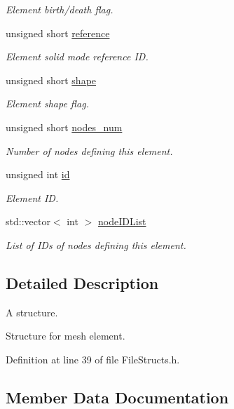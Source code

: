 \begin{DoxyCompactItemize}
\begin{DoxyCompactList}\small\item\em Element birth/death flag. \end{DoxyCompactList}\item 
unsigned short \hyperlink{struct___elements_s_af9fa947d626f4bcdcb030fe4fab611c4}{reference}
\begin{DoxyCompactList}\small\item\em Element solid mode reference ID. \end{DoxyCompactList}\item 
unsigned short \hyperlink{struct___elements_s_aff93e58a2996c7dcae7441a7d6804da0}{shape}
\begin{DoxyCompactList}\small\item\em Element shape flag. \end{DoxyCompactList}\item 
unsigned short \hyperlink{struct___elements_s_a49bec774408021bd15702208237fb17f}{nodes\+\_\+num}
\begin{DoxyCompactList}\small\item\em Number of nodes defining this element. \end{DoxyCompactList}\item 
unsigned int \hyperlink{struct___elements_s_a782d0149d17748d22630799112b10680}{id}
\begin{DoxyCompactList}\small\item\em Element ID. \end{DoxyCompactList}\item 
std\+::vector$<$ int $>$ \hyperlink{struct___elements_s_a9e3631ebed48f8c5869f08f0970c251c}{node\+I\+D\+List}
\begin{DoxyCompactList}\small\item\em List of I\+Ds of nodes defining this element. \end{DoxyCompactList}\end{DoxyCompactItemize}


\subsection{Detailed Description}
A structure. 

Structure for mesh element. 

Definition at line 39 of file File\+Structs.\+h.



\subsection{Member Data Documentation}
